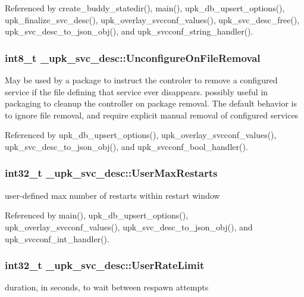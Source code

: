 Referenced by create\_\-buddy\_\-statedir(), main(), upk\_\-db\_\-upsert\_\-options(), upk\_\-finalize\_\-svc\_\-desc(), upk\_\-overlay\_\-svcconf\_\-values(), upk\_\-svc\_\-desc\_\-free(), upk\_\-svc\_\-desc\_\-to\_\-json\_\-obj(), and upk\_\-svcconf\_\-string\_\-handler().

\subsubsection[{UnconfigureOnFileRemoval}]{\setlength{\rightskip}{0pt plus 5cm}int8\_\-t {\bf \_\-upk\_\-svc\_\-desc::UnconfigureOnFileRemoval}}\label{struct__upk__svc__desc_a16219aee7c0f81d81eaa8a6899e38714}
May be used by a package to instruct the controler to remove a configured service if the file defining that service ever disappears. possibly useful in packaging to cleanup the controller on package removal. The default behavior is to ignore file removal, and require explicit manual removal of configured services 

Referenced by upk\_\-db\_\-upsert\_\-options(), upk\_\-overlay\_\-svcconf\_\-values(), upk\_\-svc\_\-desc\_\-to\_\-json\_\-obj(), and upk\_\-svcconf\_\-bool\_\-handler().

\subsubsection[{UserMaxRestarts}]{\setlength{\rightskip}{0pt plus 5cm}int32\_\-t {\bf \_\-upk\_\-svc\_\-desc::UserMaxRestarts}}\label{struct__upk__svc__desc_adc59ece6c494206a03d7e4a032e7eb34}
user-\/defined max number of restarts within restart window 

Referenced by main(), upk\_\-db\_\-upsert\_\-options(), upk\_\-overlay\_\-svcconf\_\-values(), upk\_\-svc\_\-desc\_\-to\_\-json\_\-obj(), and upk\_\-svcconf\_\-int\_\-handler().

\subsubsection[{UserRateLimit}]{\setlength{\rightskip}{0pt plus 5cm}int32\_\-t {\bf \_\-upk\_\-svc\_\-desc::UserRateLimit}}\label{struct__upk__svc__desc_afe1ca494932eb02304d2f0d4753eda33}
duration, in seconds, to wait between respawn attempts 

